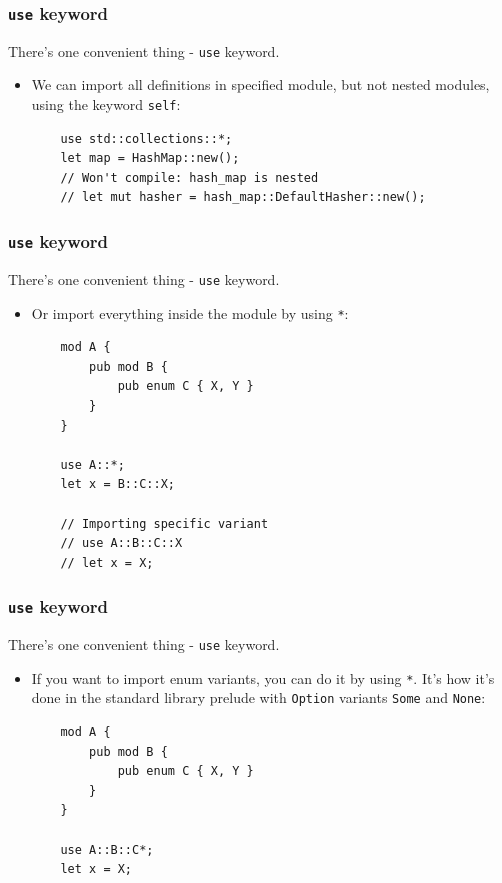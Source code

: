 \documentclass[aspectratio=1610,t]{beamer}
\begin{document}
\begin{frame}[fragile]
\frametitle{\texttt{use} keyword}
There's one convenient thing - \texttt{use} keyword.

\begin{itemize}
    \item<1-> We can import all definitions in specified module, but not nested modules, using the keyword \texttt{self}:
    
    \begin{verbatim}
    use std::collections::*;
    let map = HashMap::new();
    // Won't compile: hash_map is nested
    // let mut hasher = hash_map::DefaultHasher::new();
    \end{verbatim}
\end{itemize}
\end{frame}


\begin{frame}[fragile]
\frametitle{\texttt{use} keyword}
There's one convenient thing - \texttt{use} keyword.

\begin{itemize}
    \item<1-> Or import everything inside the module by using \texttt{*}:
    
    \begin{verbatim}
    mod A {
        pub mod B {
            pub enum C { X, Y }
        }
    }

    use A::*;
    let x = B::C::X;

    // Importing specific variant
    // use A::B::C::X
    // let x = X;
    \end{verbatim}
\end{itemize}
\end{frame}


\begin{frame}[fragile]
\frametitle{\texttt{use} keyword}
There's one convenient thing - \texttt{use} keyword.

\begin{itemize}
    \item<1-> If you want to import enum variants, you can do it by using \texttt{*}. It's how it's done in the standard library prelude with \texttt{Option} variants \texttt{Some} and \texttt{None}:
    
    \begin{verbatim}
    mod A {
        pub mod B {
            pub enum C { X, Y }
        }
    }

    use A::B::C*;
    let x = X;
    \end{verbatim}
\end{itemize}
\end{frame}
\end{document}
